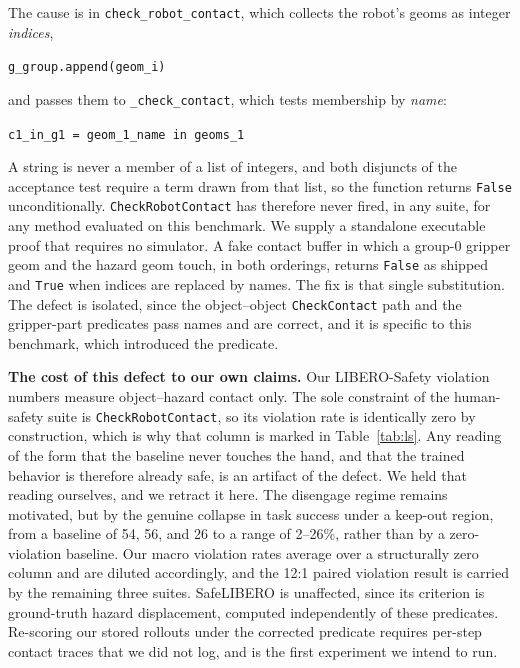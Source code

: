 \documentclass[conference]{IEEEtran}
\begin{document}
The cause is in \texttt{check\_robot\_contact}, which collects the robot's geoms as integer \emph{indices},
\begin{center}\small\texttt{g\_group.append(geom\_i)}\end{center}
and passes them to \texttt{\_check\_contact}, which tests membership by \emph{name}:
\begin{center}\small\texttt{c1\_in\_g1 = geom\_1\_name in geoms\_1}\end{center}
A string is never a member of a list of integers, and both disjuncts of the acceptance test require a term drawn from that list, so the function returns \texttt{False} unconditionally. \texttt{CheckRobotContact} has therefore never fired, in any suite, for any method evaluated on this benchmark. We supply a standalone executable proof that requires no simulator. A fake contact buffer in which a group-0 gripper geom and the hazard geom touch, in both orderings, returns \texttt{False} as shipped and \texttt{True} when indices are replaced by names. The fix is that single substitution. The defect is isolated, since the object--object \texttt{CheckContact} path and the gripper-part predicates pass names and are correct, and it is specific to this benchmark, which introduced the predicate.

\textbf{The cost of this defect to our own claims.} Our LIBERO-Safety violation numbers measure object--hazard contact only. The sole constraint of the human-safety suite is \texttt{CheckRobotContact}, so its violation rate is identically zero by construction, which is why that column is marked in Table~\ref{tab:ls}. Any reading of the form that the baseline never touches the hand, and that the trained behavior is therefore already safe, is an artifact of the defect. We held that reading ourselves, and we retract it here. The disengage regime remains motivated, but by the genuine collapse in task success under a keep-out region, from a baseline of 54, 56, and 26 to a range of 2--26\%, rather than by a zero-violation baseline. Our macro violation rates average over a structurally zero column and are diluted accordingly, and the 12:1 paired violation result is carried by the remaining three suites. SafeLIBERO is unaffected, since its criterion is ground-truth hazard displacement, computed independently of these predicates. Re-scoring our stored rollouts under the corrected predicate requires per-step contact traces that we did not log, and is the first experiment we intend to run.
\end{document}
